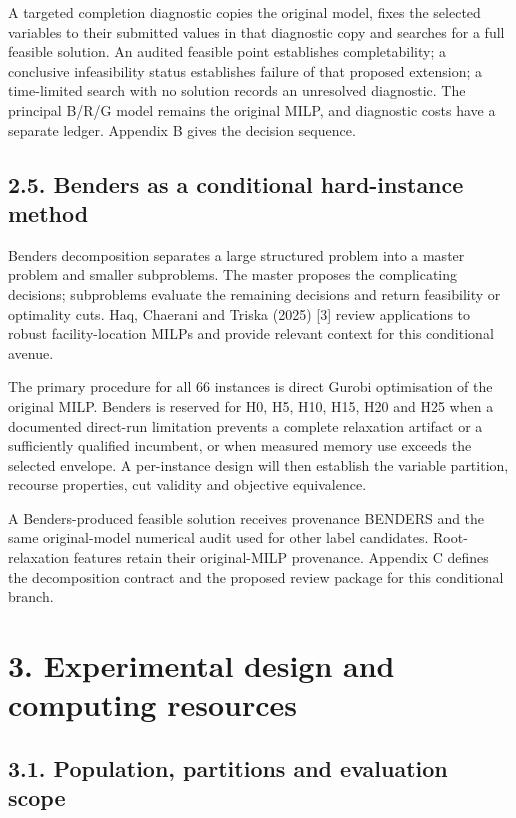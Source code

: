\documentclass[
  british,
  10pt,
]{article}
\begin{document}
A targeted completion diagnostic copies the original model, fixes the
selected variables to their submitted values in that diagnostic copy and
searches for a full feasible solution. An audited feasible point
establishes completability; a conclusive infeasibility status
establishes failure of that proposed extension; a time-limited search
with no solution records an unresolved diagnostic. The principal B/R/G
model remains the original MILP, and diagnostic costs have a separate
ledger. Appendix B gives the decision sequence.

\subsection{2.5. Benders as a conditional hard-instance
method}\label{benders-as-a-conditional-hard-instance-method}

Benders decomposition separates a large structured problem into a master
problem and smaller subproblems. The master proposes the complicating
decisions; subproblems evaluate the remaining decisions and return
feasibility or optimality cuts. Haq, Chaerani and Triska (2025) {[}3{]}
review applications to robust facility-location MILPs and provide
relevant context for this conditional avenue.

The primary procedure for all 66 instances is direct Gurobi optimisation
of the original MILP. Benders is reserved for H0, H5, H10, H15, H20 and
H25 when a documented direct-run limitation prevents a complete
relaxation artifact or a sufficiently qualified incumbent, or when
measured memory use exceeds the selected envelope. A per-instance design
will then establish the variable partition, recourse properties, cut
validity and objective equivalence.

A Benders-produced feasible solution receives provenance BENDERS and the
same original-model numerical audit used for other label candidates.
Root-relaxation features retain their original-MILP provenance. Appendix
C defines the decomposition contract and the proposed review package for
this conditional branch.

\section{3. Experimental design and computing
resources}\label{experimental-design-and-computing-resources}

\subsection{3.1. Population, partitions and evaluation
scope}\label{population-partitions-and-evaluation-scope}
\end{document}
